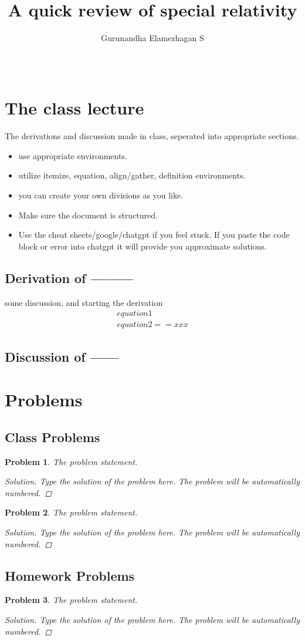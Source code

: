 \documentclass{article}
\title{A quick review of special relativity}
\author{Gurunandha Elamezhagan S}
\date{\ }
\newtheorem{problem}{Problem}[subsection]
\begin{document}
\maketitle
\section{The class lecture}
The derivations and discussion made in class, seperated into appropriate sections.
\begin{itemize}
	\item use appropriate environments.
	\item utilize itemize, equation, align/gather, definition environments.
	\item you can create your own divisions as you like.
	\item Make sure the document is structured.
	\item Use the cheat sheets/google/chatgpt if you feel stuck. If you paste the code block or error into chatgpt it will provide you approximate solutions.
\end{itemize}
\subsection{Derivation of ---------}
some discussion, and starting the derivation 
\begin{gather}
	equation 1\\
	equation 2 ==xxx
\end{gather}
\subsection{Discussion of ------}
\lipsum[1-2]


\section{Problems}
\subsection{Class Problems}
\begin{problem}
	The problem statement.
	\begin{proof}[Solution]
		Type the solution of the problem here. The problem will be automatically numbered.
	\end{proof}
\end{problem}
\begin{problem}
	The problem statement.
	\begin{proof}[Solution]
		Type the solution of the problem here. The problem will be automatically numbered.
	\end{proof}
\end{problem}
\subsection{Homework Problems}
\begin{problem}
	The problem statement.
	\begin{proof}[Solution]
		Type the solution of the problem here. The problem will be automatically numbered.
	\end{proof}
\end{problem}
\end{document}
